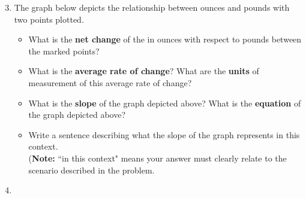 \documentclass[10pt]{article}
\begin{document}
\begin{enumerate}\setcounter{enumi}{2}

\item The graph below depicts the relationship between ounces and pounds with two points plotted.

\begin{center}
\end{center}

    \begin{itemize}
    
    \item[(a)] What is the {\bf net change} of the in ounces with respect to pounds between the marked points?
    
    \item[(b)] What is the {\bf average rate of change}? What are the {\bf units} of measurement of this average rate of change? 
    
    \item[(c)] What is the {\bf slope} of the graph depicted above? What is the {\bf equation} of the graph depicted above?
    
    \item[(d)] Write a sentence describing what the slope of the graph represents in this context.\\ 
    ({\bf Note:} ``in this context" means your answer must clearly relate to the scenario described in the problem.
    \end{itemize}

\item 

\end{enumerate}
\end{document}
